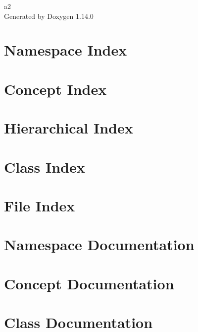 \documentclass[twoside]{book}
\newcommand{\+}{\discretionary{\mbox{\scriptsize$\hookleftarrow$}}{}{}}
\newcommand{\clearemptydoublepage}{%
    \newpage{\pagestyle{empty}\cleardoublepage}%
  }
\begin{document}
  \raggedbottom
    \hypersetup{pageanchor=false,
                bookmarksnumbered=true,
                pdfencoding=unicode
               }
  \begin{titlepage}
  \vspace*{7cm}
  \begin{center}%
  {\Large a2}\\
  \vspace*{1cm}
  {\large Generated by Doxygen 1.14.0}\\
  \end{center}
  \end{titlepage}
  \clearemptydoublepage
  \tableofcontents
  \clearemptydoublepage
  \hypersetup{pageanchor=true}
\chapter{Namespace Index}

\chapter{Concept Index}

\chapter{Hierarchical Index}

\chapter{Class Index}

\chapter{File Index}

\chapter{Namespace Documentation}

\chapter{Concept Documentation}

\chapter{Class Documentation}






















\end{document}
